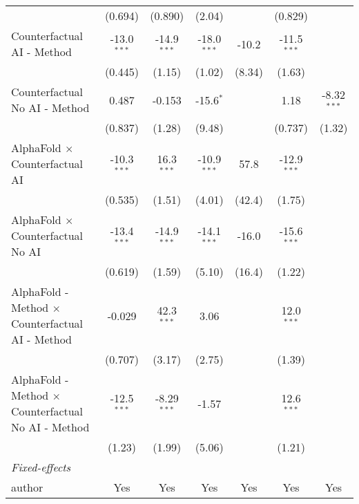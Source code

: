 \begin{tabular}{lcccccc}
                                                              & (0.694)       & (0.890)       & (2.04)        &               & (0.829)       &   \\   
   Counterfactual AI - Method                                 & -13.0$^{***}$ & -14.9$^{***}$ & -18.0$^{***}$ & -10.2         & -11.5$^{***}$ &   \\   
                                                              & (0.445)       & (1.15)        & (1.02)        & (8.34)        & (1.63)        &   \\   
   Counterfactual No AI - Method                              & 0.487         & -0.153        & -15.6$^{*}$   &               & 1.18          & -8.32$^{***}$\\   
                                                              & (0.837)       & (1.28)        & (9.48)        &               & (0.737)       & (1.32)\\   
   AlphaFold $\times$ Counterfactual AI                       & -10.3$^{***}$ & 16.3$^{***}$  & -10.9$^{***}$ & 57.8          & -12.9$^{***}$ &   \\   
                                                              & (0.535)       & (1.51)        & (4.01)        & (42.4)        & (1.75)        &   \\   
   AlphaFold $\times$ Counterfactual No AI                    & -13.4$^{***}$ & -14.9$^{***}$ & -14.1$^{***}$ & -16.0         & -15.6$^{***}$ &   \\   
                                                              & (0.619)       & (1.59)        & (5.10)        & (16.4)        & (1.22)        &   \\   
   AlphaFold - Method $\times$ Counterfactual AI - Method     & -0.029        & 42.3$^{***}$  & 3.06          &               & 12.0$^{***}$  &   \\   
                                                              & (0.707)       & (3.17)        & (2.75)        &               & (1.39)        &   \\   
   AlphaFold - Method $\times$ Counterfactual No AI - Method  & -12.5$^{***}$ & -8.29$^{***}$ & -1.57         &               & 12.6$^{***}$  &   \\   
                                                              & (1.23)        & (1.99)        & (5.06)        &               & (1.21)        &   \\   
   \midrule
   \emph{Fixed-effects}\\
   author                                                     & Yes           & Yes           & Yes           & Yes           & Yes           & Yes\\  

\end{tabular}
